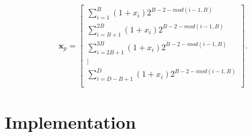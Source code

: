 \documentclass[conference,compsoc]{IEEEtran}
\begin{document}

\begin{equation}
\mathbf{x}_p= \begin{bmatrix}
    \sum^{B}_{i=1}(1+x_i)2^{B-2 - mod(i-1,B)}\\[0.3em]
     \sum^{2B}_{i=B+1}(1+x_i)2^{B-2 - mod(i-1,B)}\\[0.3em]
     \sum^{3B}_{i=2B+1}(1+x_i)2^{B-2 - mod(i-1,B)}\\[0.3em]
       \vdots \\[0.3em]
 \sum^{D}_{i=D-B+1}(1+x_i)2^{B-2 - mod(i-1,B)}\\[0.3em]
     \end{bmatrix}.
\end{equation}


\section{Implementation}
\end{document}
